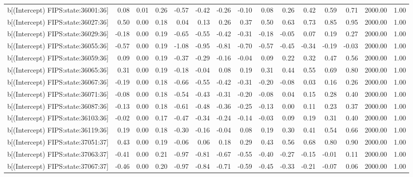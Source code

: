 \begin{table}[ht]
\begin{tabular}{rrrrrrrrrrrrrrr}
  b[(Intercept) FIPS:state:36001:36] & 0.08 & 0.01 & 0.26 & -0.57 & -0.42 & -0.26 & -0.10 & 0.08 & 0.26 & 0.42 & 0.59 & 0.71 & 2000.00 & 1.00 \\ 
  b[(Intercept) FIPS:state:36027:36] & 0.50 & 0.00 & 0.18 & 0.04 & 0.13 & 0.26 & 0.37 & 0.50 & 0.63 & 0.73 & 0.85 & 0.95 & 2000.00 & 1.00 \\ 
  b[(Intercept) FIPS:state:36029:36] & -0.18 & 0.00 & 0.19 & -0.65 & -0.55 & -0.42 & -0.31 & -0.18 & -0.05 & 0.07 & 0.19 & 0.27 & 2000.00 & 1.00 \\ 
  b[(Intercept) FIPS:state:36055:36] & -0.57 & 0.00 & 0.19 & -1.08 & -0.95 & -0.81 & -0.70 & -0.57 & -0.45 & -0.34 & -0.19 & -0.03 & 2000.00 & 1.00 \\ 
  b[(Intercept) FIPS:state:36059:36] & 0.09 & 0.00 & 0.19 & -0.37 & -0.29 & -0.16 & -0.04 & 0.09 & 0.22 & 0.32 & 0.47 & 0.56 & 2000.00 & 1.00 \\ 
  b[(Intercept) FIPS:state:36065:36] & 0.31 & 0.00 & 0.19 & -0.18 & -0.04 & 0.08 & 0.19 & 0.31 & 0.44 & 0.55 & 0.69 & 0.80 & 2000.00 & 1.00 \\ 
  b[(Intercept) FIPS:state:36067:36] & -0.19 & 0.00 & 0.18 & -0.66 & -0.55 & -0.42 & -0.31 & -0.20 & -0.08 & 0.03 & 0.16 & 0.26 & 2000.00 & 1.00 \\ 
  b[(Intercept) FIPS:state:36071:36] & -0.08 & 0.00 & 0.18 & -0.54 & -0.43 & -0.31 & -0.20 & -0.08 & 0.04 & 0.15 & 0.28 & 0.40 & 2000.00 & 1.00 \\ 
  b[(Intercept) FIPS:state:36087:36] & -0.13 & 0.00 & 0.18 & -0.61 & -0.48 & -0.36 & -0.25 & -0.13 & 0.00 & 0.11 & 0.23 & 0.37 & 2000.00 & 1.00 \\ 
  b[(Intercept) FIPS:state:36103:36] & -0.02 & 0.00 & 0.17 & -0.47 & -0.34 & -0.24 & -0.14 & -0.03 & 0.09 & 0.19 & 0.31 & 0.40 & 2000.00 & 1.00 \\ 
  b[(Intercept) FIPS:state:36119:36] & 0.19 & 0.00 & 0.18 & -0.30 & -0.16 & -0.04 & 0.08 & 0.19 & 0.30 & 0.41 & 0.54 & 0.66 & 2000.00 & 1.00 \\ 
  b[(Intercept) FIPS:state:37051:37] & 0.43 & 0.00 & 0.19 & -0.06 & 0.06 & 0.18 & 0.29 & 0.43 & 0.56 & 0.68 & 0.80 & 0.90 & 2000.00 & 1.00 \\ 
  b[(Intercept) FIPS:state:37063:37] & -0.41 & 0.00 & 0.21 & -0.97 & -0.81 & -0.67 & -0.55 & -0.40 & -0.27 & -0.15 & -0.01 & 0.11 & 2000.00 & 1.00 \\ 
  b[(Intercept) FIPS:state:37067:37] & -0.46 & 0.00 & 0.20 & -0.97 & -0.84 & -0.71 & -0.59 & -0.45 & -0.33 & -0.21 & -0.07 & 0.06 & 2000.00 & 1.00 \\ 

\end{tabular}
\end{table}
